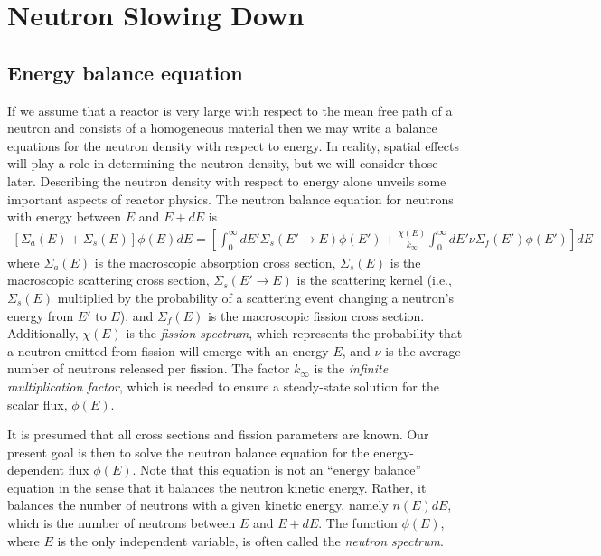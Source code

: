 \documentclass[11pt]{article}
\begin{document}
\section{Neutron Slowing Down}
\label{sec:orgheadline33}
\subsection{Energy balance equation}
\label{sec:orgheadline25}
If we assume that a reactor is very large with respect to the mean free path of a neutron and consists of a homogeneous material then we may write a balance equations for the neutron density with respect to energy.  In reality, spatial effects will play a role in determining the neutron density, but we will consider those later.  Describing the neutron density with respect to energy alone unveils some important aspects of reactor physics.  The neutron balance equation for neutrons with energy between \(E\) and \(E+dE\) is
\begin{align}
  \left[ \Sigma_a(E) + \Sigma_s(E) \right] \phi(E) dE
  = \left[ \int_0^\infty dE' \Sigma_s(E' \rightarrow E ) \phi(E')
           + \frac{\chi(E)}{k_\infty} \int_0^\infty dE' \nu\Sigma_f(E') \phi(E') \right] dE
\end{align}
where \(\Sigma_a(E)\) is the macroscopic absorption cross section, \(\Sigma_s(E)\) is the macroscopic scattering cross section, \(\Sigma_s(E' \rightarrow E)\) is the scattering kernel (i.e., \(\Sigma_s(E)\) multiplied by the probability of a scattering event changing a neutron's energy from \(E'\) to \(E\)), and \(\Sigma_f(E)\) is the macroscopic fission cross section.  Additionally, \(\chi(E)\) is the \emph{fission spectrum}, which represents the probability that a neutron emitted from fission will emerge with an energy \(E\), and \(\nu\) is the average number of neutrons released per fission.  The factor \(k_\infty\) is the \emph{infinite multiplication factor}, which is needed to ensure a steady-state solution for the scalar flux, \(\phi(E)\).

It is presumed that all cross sections and fission parameters are known.  Our present goal is then to solve the neutron balance equation for the energy-dependent flux \(\phi(E)\).  Note that this equation is not an ``energy balance'' equation in the sense that it balances the neutron kinetic energy.  Rather, it balances the number of neutrons with a given kinetic energy, namely \(n(E)dE\), which is the number of neutrons between \(E\) and \(E+dE\).  The function \(\phi(E)\), where \(E\) is the only independent variable, is often called the \emph{neutron spectrum}.
\end{document}
